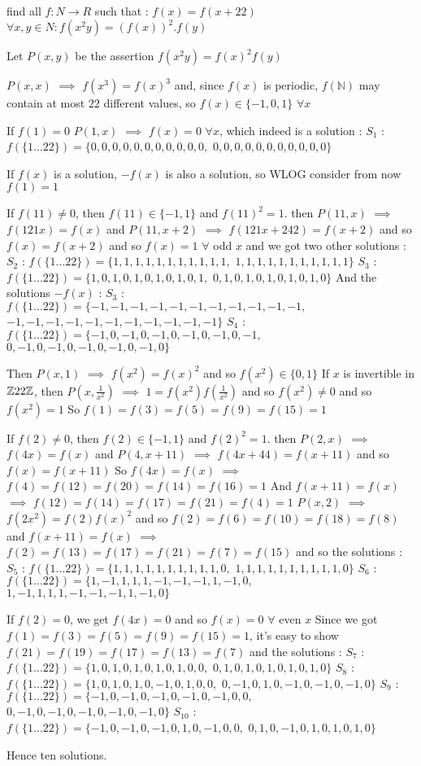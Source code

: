 \begin{solution}
	\begin{tcolorbox}find all $ f: N \to R$ such that :
$ f(x) = f(x + 22)$
$ \forall x,y \in N: f(x^2y) = (f(x))^2.f(y)$\end{tcolorbox}

Let $ P(x,y)$ be the assertion $ f(x^2y)=f(x)^2f(y)$

$ P(x,x)$ $ \implies$ $ f(x^3)=f(x)^3$ and, since $ f(x)$ is periodic, $ f(\mathbb N)$ may contain at most $ 22$ different values, so $ f(x)\in\{-1,0,1\}$ $ \forall x$

If $ f(1)=0$ $ P(1,x)$ $ \implies$ $ f(x)=0$ $ \forall x$, which indeed is a solution :
$ S_1$ : $ f(\{1...22\} )=\{0,0,0,0,0,0,0,0,0,0,0,$ $ 0,0,0,0,0,0,0,0,0,0,0\}$

If $ f(x)$ is a solution, $ -f(x)$ is also a solution, so WLOG consider from now $ f(1)=1$

If $ f(11)\neq 0$, then $ f(11)\in\{-1,1\}$ and $ f(11)^2=1$. then $ P(11,x)$ $ \implies$ $ f(121x)=f(x)$ and $ P(11,x+2)$ $ \implies$ $ f(121x+242)=f(x+2)$ and so $ f(x)=f(x+2)$ and so $ f(x)=1$ $ \forall$ odd $ x$ and we got two other solutions :
$ S_2$ : $ f(\{1...22\})=\{1,1,1,1,1,1,1,1,1,1,1,$ $ 1,1,1,1,1,1,1,1,1,1,1\}$
$ S_3$ : $ f(\{1...22\})=\{1,0,1,0,1,0,1,0,1,0,1,$ $ 0,1,0,1,0,1,0,1,0,1,0\}$
And the solutions $ -f(x)$ :
$ S_3$ : $ f(\{1...22\})=\{-1,-1,-1,-1,-1,-1,-1,-1,-1,-1,-1,$ $ -1,-1,-1,-1,-1,-1,-1,-1,-1,-1,-1\}$
$ S_4$ : $ f(\{1...22\})=\{-1,0,-1,0,-1,0,-1,0,-1,0,-1,$ $ 0,-1,0,-1,0,-1,0,-1,0,-1,0\}$

Then $ P(x,1)$ $ \implies$ $ f(x^2)=f(x)^2$ and so $ f(x^2)\in\{0,1\}$
If $ x$ is invertible in $ \mathbb Z\/22\mathbb Z$, then $ P(x,\frac 1{x^2})$ $ \implies$ $ 1=f(x^2)f(\frac 1{x^2})$ and so $ f(x^2)\neq 0$ and so $ f(x^2)=1$
So $ f(1)=f(3)=f(5)=f(9)=f(15)=1$

If $ f(2)\neq 0$, then $ f(2)\in\{-1,1\}$ and $ f(2)^2=1$. then $ P(2,x)$ $ \implies$ $ f(4x)=f(x)$ and $ P(4,x+11)$ $ \implies$ $ f(4x+44)=f(x+11)$ and so $ f(x)=f(x+11)$ 
So $ f(4x)=f(x)$ $ \implies$ $ f(4)=f(12)=f(20)=f(14)=f(16)=1$
And $ f(x+11)=f(x)$ $ \implies$ $ f(12)=f(14)=f(17)=f(21)=f(4)=1$
$ P(x,2)$ $ \implies$ $ f(2x^2)=f(2)f(x)^2$ and so $ f(2)=f(6)=f(10)=f(18)=f(8)$ and $ f(x+11)=f(x)$ $ \implies$ $ f(2)=f(13)=f(17)=f(21)=f(7)=f(15)$ and so the solutions :
$ S_5$ : $ f(\{1...22\})=\{1,1,1,1,1,1,1,1,1,1,0,$ $ 1,1,1,1,1,1,1,1,1,1,0\}$
$ S_6$ : $ f(\{1...22\})=\{1,-1,1,1,1,-1,-1,-1,1,-1,0,$ $ 1,-1,1,1,1,-1,-1,-1,1,-1,0\}$

If $ f(2)=0$, we get $ f(4x)=0$ and so $ f(x)=0$ $ \forall$ even $ x$
Since we got $ f(1)=f(3)=f(5)=f(9)=f(15)=1$, it's easy to show $ f(21)=f(19)=f(17)=f(13)=f(7)$ and the solutions :
$ S_7$ : $ f(\{1...22\})=\{1,0,1,0,1,0,1,0,1,0,0,$ $ 0,1,0,1,0,1,0,1,0,1,0\}$
$ S_8$ : $ f(\{1...22\})=\{1,0,1,0,1,0,-1,0,1,0,0,$ $ 0,-1,0,1,0,-1,0,-1,0,-1,0\}$
$ S_9$ : $ f(\{1...22\})=\{-1,0,-1,0,-1,0,-1,0,-1,0,0,$ $ 0,-1,0,-1,0,-1,0,-1,0,-1,0\}$
$ S_{10}$ : $ f(\{1...22\})=\{-1,0,-1,0,-1,0,1,0,-1,0,0,$ $ 0,1,0,-1,0,1,0,1,0,1,0\}$

Hence ten solutions.
\end{solution}
